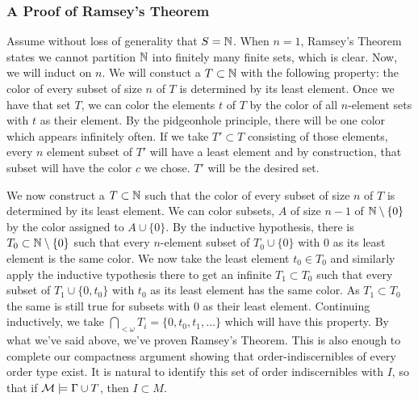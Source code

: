 \subsubsection{A Proof of Ramsey's Theorem}
Assume without loss of generality that \(S = \mathbb{N}\).
When \(n=1\), Ramsey's Theorem states we cannot partition \(\mathbb{N}\) into finitely many finite sets, which is clear.
Now, we will induct on \(n\). 
We will constuct a \(T \subset \mathbb{N}\) with the following property: the color of every subset of size \(n\) of \(T\) is determined by its least element. 
Once we have that set \(T\), we can color the elements \(t\) of \(T\) by the color of all \(n\)-element sets with \(t\) as their element. 
By the pidgeonhole principle, there will be one color which appears infinitely often. 
If we take \(T' \subset T\) consisting of those elements, every \(n\) element subset of \(T'\) will have a least element and by construction, that subset will have the color \(c\) we chose. 
\(T'\) will be the desired set. 

We now construct a \(T \subset \mathbb{N}\) such that the color of every subset of size \(n\) of \(T\) is determined by its least element. 
We can color subsets, \(A\) of size \(n-1\) of \(\mathbb{N} \setminus \{0\}\) by the color assigned to \(A \cup \{0\}\). 
By the inductive hypothesis, there is \(T_0 \subset \mathbb{N} \setminus \{0\}\) such that every \(n\)-element subset of \(T_0 \cup \{0\}\) with 0 as its least element is the same color. 
We now take the least element \(t_0 \in T_0\) and similarly apply the inductive typothesis there to get an infinite \(T_1 \subset T_0\) such that every subset of \(T_1 \cup \{0, t_0\}\) with \(t_0\) as its least element has the same color. 
As \(T_1 \subset T_0\) the same is still true for subsets with \(0\) as their least element. 
Continuing inductively, we take \(\bigcap_{<\omega}T_i = \{0, t_0, t_1, \ldots\}\) which will have this property. 
By what we've said above, we've proven Ramsey's Theorem. 
This is also enough to complete our compactness argument showing that order-indiscernibles of every order type exist.  
It is natural to identify this set of order indiscernibles with \(I\), so that if \(\mathcal{M} \models \Gamma \cup T\), then \(I \subset M\).

